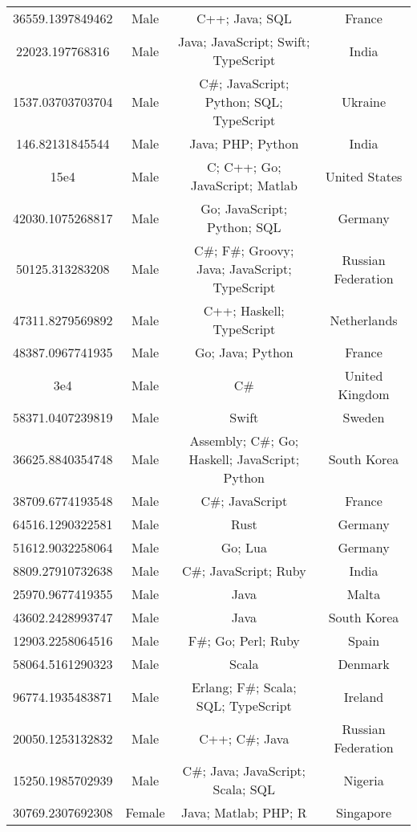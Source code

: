 \begin{center}
\begin{tabular}{ |c|c|c|c| }
36559.1397849462  &  Male  &  C++; Java; SQL  &  France  \\ 
22023.197768316  &  Male  &  Java; JavaScript; Swift; TypeScript  &  India  \\ 
1537.03703703704  &  Male  &  C\#; JavaScript; Python; SQL; TypeScript  &  Ukraine  \\ 
146.82131845544  &  Male  &  Java; PHP; Python  &  India  \\ 
15e4  &  Male  &  C; C++; Go; JavaScript; Matlab  &  United States  \\ 
42030.1075268817  &  Male  &  Go; JavaScript; Python; SQL  &  Germany  \\ 
50125.313283208  &  Male  &  C\#; F\#; Groovy; Java; JavaScript; TypeScript  &  Russian Federation  \\ 
47311.8279569892  &  Male  &  C++; Haskell; TypeScript  &  Netherlands  \\ 
48387.0967741935  &  Male  &  Go; Java; Python  &  France  \\ 
3e4  &  Male  &  C\#  &  United Kingdom  \\ 
58371.0407239819  &  Male  &  Swift  &  Sweden  \\ 
36625.8840354748  &  Male  &  Assembly; C\#; Go; Haskell; JavaScript; Python  &  South Korea  \\ 
38709.6774193548  &  Male  &  C\#; JavaScript  &  France  \\ 
64516.1290322581  &  Male  &  Rust  &  Germany  \\ 
51612.9032258064  &  Male  &  Go; Lua  &  Germany  \\ 
8809.27910732638  &  Male  &  C\#; JavaScript; Ruby  &  India  \\ 
25970.9677419355  &  Male  &  Java  &  Malta  \\ 
43602.2428993747  &  Male  &  Java  &  South Korea  \\ 
12903.2258064516  &  Male  &  F\#; Go; Perl; Ruby  &  Spain  \\ 
58064.5161290323  &  Male  &  Scala  &  Denmark  \\ 
96774.1935483871  &  Male  &  Erlang; F\#; Scala; SQL; TypeScript  &  Ireland  \\ 
20050.1253132832  &  Male  &  C++; C\#; Java  &  Russian Federation  \\ 
15250.1985702939  &  Male  &  C\#; Java; JavaScript; Scala; SQL  &  Nigeria  \\ 
30769.2307692308  &  Female  &  Java; Matlab; PHP; R  &  Singapore  \\ 

\end{tabular}
\end{center}
